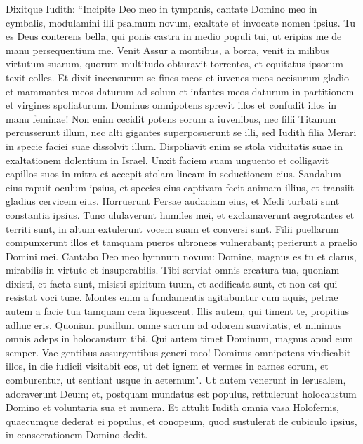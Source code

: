 \begin{biblechapter}  
\verse Dixitque Iudith: “Incipite Deo meo in tympanis, cantate Domino meo in cymbalis, modulamini illi psalmum novum, exaltate et invocate nomen ipsius. 
\verse Tu es Deus conterens bella, qui ponis castra in medio populi tui, ut eripias me de manu persequentium me. 
\verse Venit Assur a montibus, a borra, venit in milibus virtutum suarum, quorum multitudo obturavit torrentes, et equitatus ipsorum texit colles. 
\verse Et dixit incensurum se fines meos et iuvenes meos occisurum gladio et mammantes meos daturum ad solum et infantes meos daturum in partitionem et virgines spoliaturum. 
\verse Dominus omnipotens sprevit illos et confudit illos in manu feminae! 
\verse Non enim cecidit potens eorum a iuvenibus, nec filii Titanum percusserunt illum, nec alti gigantes superposuerunt se illi, sed Iudith filia Merari in specie faciei suae dissolvit illum. 
\verse Dispoliavit enim se stola viduitatis suae in exaltationem dolentium in Israel. Unxit faciem suam unguento 
\verse et colligavit capillos suos in mitra et accepit stolam lineam in seductionem eius. 
\verse Sandalum eius rapuit oculum ipsius, et species eius captivam fecit animam illius, et transiit gladius cervicem eius. 
\verse Horruerunt Persae audaciam eius, et Medi turbati sunt constantia ipsius. 
\verse Tunc ululaverunt humiles mei, et exclamaverunt aegrotantes et territi sunt, in altum extulerunt vocem suam et conversi sunt. 
\verse Filii puellarum compunxerunt illos et tamquam pueros ultroneos vulnerabant; perierunt a praelio Domini mei. 
\verse Cantabo Deo meo hymnum novum: Domine, magnus es tu et clarus, mirabilis in virtute et insuperabilis. 
\verse Tibi serviat omnis creatura tua, quoniam dixisti, et facta sunt, misisti spiritum tuum, et aedificata sunt, et non est qui resistat voci tuae. 
\verse Montes enim a fundamentis agitabuntur cum aquis, petrae autem a facie tua tamquam cera liquescent. Illis autem, qui timent te, propitius adhuc eris. 
\verse Quoniam pusillum omne sacrum ad odorem suavitatis, et minimus omnis adeps in holocaustum tibi. Qui autem timet Dominum, magnus apud eum semper. 
\verse Vae gentibus assurgentibus generi meo! Dominus omnipotens vindicabit illos, in die iudicii visitabit eos, ut det ignem et vermes in carnes eorum, et comburentur, ut sentiant usque in aeternum". 
\verse Ut autem venerunt in Ierusalem, adoraverunt Deum; et, postquam mundatus est populus, rettulerunt holocaustum Domino et voluntaria sua et munera. 
\verse Et attulit Iudith omnia vasa Holofernis, quaecumque dederat ei populus, et conopeum, quod sustulerat de cubiculo ipsius, in consecrationem Domino dedit.  

\end{biblechapter}
